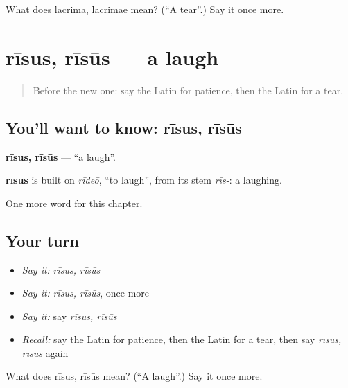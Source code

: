 \begin{tcolorbox}[breakable,colback=teal!4,colframe=teal!35!black,title={Before you move on}]
What does lacrima, lacrimae mean? (\textquotedblleft{}A tear\textquotedblright{}.) Say it once more.
\end{tcolorbox}
\section[rīsus, rīsūs]{rīsus, rīsūs — a laugh}

\label{lesson:LA-C174-risus}



\begin{quote}
Before the new one: say the Latin for patience, then the Latin for a tear.
\end{quote}

\subsection*{You'll want to know: rīsus, rīsūs}
\textbf{rīsus, rīsūs} — \textquotedblleft{}a laugh\textquotedblright{}.

\begin{cousinweb}
\textbf{rīsus} is built on \emph{rīdeō}, \textquotedblleft{}to laugh\textquotedblright{}, from its stem \emph{rīs-}: a laughing.
\end{cousinweb}

\begin{grammarlens}[title={What you've built}]
One more word for this chapter.
\end{grammarlens}

\subsection*{Your turn}
\begin{itemize}
\raggedright
  \item \emph{Say it:} \emph{rīsus, rīsūs}
  \item \emph{Say it:} \emph{rīsus, rīsūs}, once more
  \item \emph{Say it:} say \emph{rīsus, rīsūs}
  \item \emph{Recall:} say the Latin for patience, then the Latin for a tear, then say \emph{rīsus, rīsūs} again
\end{itemize}

\begin{tcolorbox}[breakable,colback=teal!4,colframe=teal!35!black,title={Before you move on}]
What does rīsus, rīsūs mean? (\textquotedblleft{}A laugh\textquotedblright{}.) Say it once more.
\end{tcolorbox}
